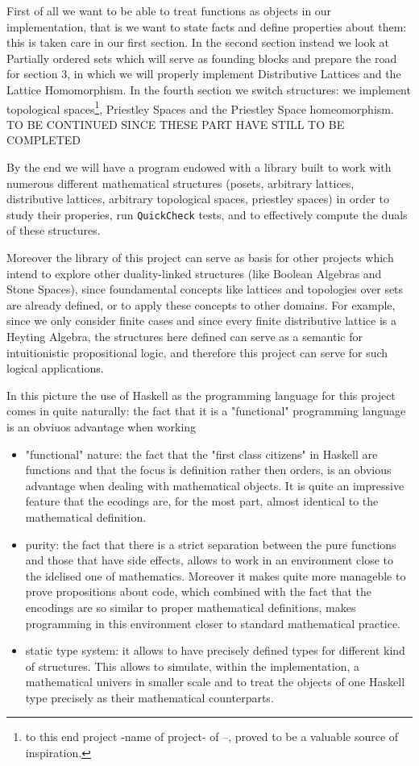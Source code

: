 First of all we want to be able to treat functions as objects in our implementation, that is we want to state facts and define properties about them: this is taken care in our first section. In the second section instead we look at Partially ordered sets which will serve as founding blocks and prepare the road for section 3, in which we will properly implement Distributive Lattices and the Lattice Homomorphism. In the fourth section we switch structures: we implement topological spaces\footnote{to this end project -name of project- of --, proved to be a valuable source of inspiration.}, Priestley Spaces and the Priestley Space homeomorphism. TO BE CONTINUED SINCE THESE PART HAVE STILL TO BE COMPLETED

By the end we will have a program endowed with a library built to work with numerous different mathematical structures (posets, arbitrary lattices, distributive lattices, arbitrary topological spaces, priestley spaces) in order to study their properies, run \texttt{QuickCheck} tests, and to effectively compute the duals of these structures.

Moreover the library of this project can serve as basis for other projects which intend to explore other duality-linked structures (like Boolean Algebras and Stone Spaces), since foundamental concepts like lattices and topologies over sets are already defined, or to apply these concepts to other domains. For example, since we only consider finite cases and since every finite distributive lattice is a Heyting Algebra, the structures here defined can serve as a semantic for intuitionistic propositional logic, and therefore this project can serve for such logical applications.


In this picture the use of Haskell as the programming language for this project comes in quite naturally: the fact that it is a "functional" programming language is an obviuos advantage when working 

\begin{itemize}
    \item "functional" nature: the fact that the "first class citizens" in Haskell are functions and that the focus is definition rather then orders, is an obvious advantage when dealing with mathematical objects. It is quite an impressive feature that the ecodings are, for the most part, almost identical to the mathematical definition. 
    \item purity: the fact that there is a strict separation between the pure functions and those that have side effects, allows to work in an environment close to the idelised one of mathematics. Moreover it makes quite more manageble to prove propositions about code, which combined with the fact that the encodings are so similar to proper mathematical definitions, makes programming in this environment closer to standard mathematical practice.
    \item static type system: it allows to have precisely defined types for different kind of structures. This allows to simulate, within the implementation, a mathematical univers in smaller scale and to treat the objects of one Haskell type precisely as their mathematical counterparts.  
\end{itemize}



